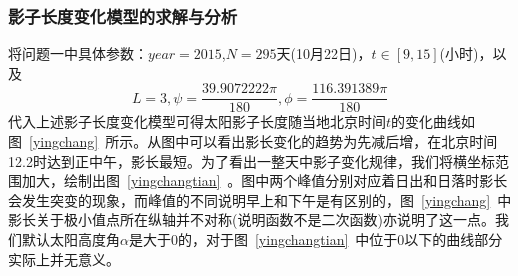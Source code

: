 \documentclass[12pt]{cumcmart}   %
\begin{document}
\subsubsection{影子长度变化模型的求解与分析}
将问题一中具体参数：$year=2015$,$N=295$天(10月22日)，$t\in[9,15]$(小时)，以及\[L=3,\psi=\frac{39.9072222\pi}{180},\phi=\frac{116.391389\pi}{180}\]代入上述影子长度变化模型可得太阳影子长度随当地北京时间$t$的变化曲线如图~\ref{yingchang}~所示。从图中可以看出影长变化的趋势为先减后增，在北京时间12.2时达到正中午，影长最短。为了看出一整天中影子变化规律，我们将横坐标范围加大，绘制出图~\ref{yingchangtian}~。图中两个峰值分别对应着日出和日落时影长会发生突变的现象，而峰值的不同说明早上和下午是有区别的，图~\ref{yingchang}~中影长关于极小值点所在纵轴并不对称(说明函数不是二次函数)亦说明了这一点。我们默认太阳高度角$\alpha$是大于0的，对于图~\ref{yingchangtian}~中位于0以下的曲线部分实际上并无意义。
\end{document}
